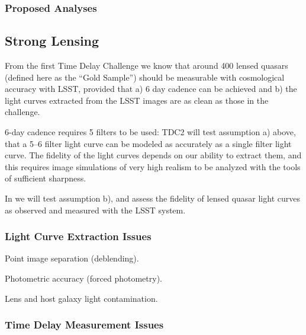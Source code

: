 \subsubsection{Proposed Analyses}
\label{\secname:supernovae:analyses}



\subsection{Strong Lensing}
\label{\secname:stronglensing}

From the first Time Delay Challenge we know that around 400 lensed
quasars (defined here as the ``Gold Sample'') should be measurable
with cosmological accuracy with LSST, provided that a) 6 day cadence
can be achieved and b) the light curves extracted from the LSST images
are as clean as those in the challenge.

6-day cadence requires 5 filters to be used: TDC2 will test
assumption a) above, that  a 5--6 filter light curve can be modeled as
accurately as a single filter light curve. The fidelity of the light
curves depends on our ability to extract them, and this requires image
simulations of very high realism to be analyzed with the tools of
sufficient sharpness.

In \TwinklesOne we will test assumption b), and assess the fidelity of
lensed quasar light curves as observed and measured with the LSST system.


\subsubsection{Light Curve Extraction Issues}
\label{\secname:stronglensing:monitor}

Point image separation (deblending).

Photometric accuracy (forced photometry).

Lens and host galaxy light contamination.



\subsubsection{Time Delay Measurement Issues}
\label{\secname:stronglensing:timedelay}

